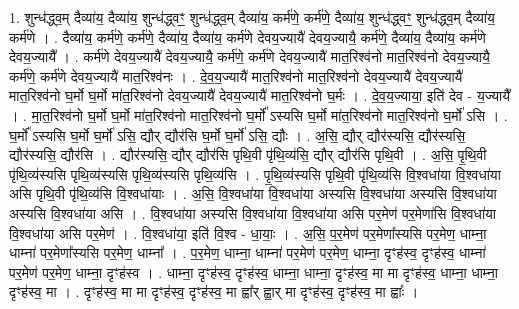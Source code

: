 \documentclass[17pt]{extarticle}
\begin{document}
1. शुन्ध॑द्ध्व॒म् दैव्या॑य॒ दैव्या॑य॒ शुन्ध॑द्ध्वꣳ॒॒ शुन्ध॑द्ध्व॒म् दैव्या॑य॒ कर्म॑णे॒ कर्म॑णे॒ दैव्या॑य॒ शुन्ध॑द्ध्वꣳ॒॒ शुन्ध॑द्ध्व॒म् दैव्या॑य॒ कर्म॑णे । . दैव्या॑य॒ कर्म॑णे॒ कर्म॑णे॒ दैव्या॑य॒ दैव्या॑य॒ कर्म॑णे देवय॒ज्यायै॑ देवय॒ज्यायै॒ कर्म॑णे॒ दैव्या॑य॒ दैव्या॑य॒ कर्म॑णे देवय॒ज्यायै᳚ । . कर्म॑णे देवय॒ज्यायै॑ देवय॒ज्यायै॒ कर्म॑णे॒ कर्म॑णे देवय॒ज्यायै॑ मात॒रिश्व॑नो मात॒रिश्व॑नो देवय॒ज्यायै॒ कर्म॑णे॒ कर्म॑णे देवय॒ज्यायै॑ मात॒रिश्व॑नः । . दे॒व॒य॒ज्यायै॑ मात॒रिश्व॑नो मात॒रिश्व॑नो देवय॒ज्यायै॑ देवय॒ज्यायै॑ मात॒रिश्व॑नो घ॒र्मो घ॒र्मो मा॑त॒रिश्व॑नो देवय॒ज्यायै॑ देवय॒ज्यायै॑ मात॒रिश्व॑नो घ॒र्मः । . दे॒व॒य॒ज्याया॒ इति॑ देव - य॒ज्यायै᳚ । . मा॒त॒रिश्व॑नो घ॒र्मो घ॒र्मो मा॑त॒रिश्व॑नो मात॒रिश्व॑नो घ॒र्मो᳚ ऽस्यसि घ॒र्मो मा॑त॒रिश्व॑नो मात॒रिश्व॑नो घ॒र्मो॑ ऽसि । . घ॒र्मो᳚ ऽस्यसि घ॒र्मो घ॒र्मो॑ ऽसि॒ द्यौर् द्यौर॑सि घ॒र्मो घ॒र्मो॑ ऽसि॒ द्यौः । . अ॒सि॒ द्यौर् द्यौर॑स्यसि॒ द्यौर॑स्यसि॒ द्यौर॑स्यसि॒ द्यौर॑सि । . द्यौर॑स्यसि॒ द्यौर् द्यौर॑सि पृथि॒वी पृ॑थि॒व्य॑सि॒ द्यौर् द्यौर॑सि पृथि॒वी । . अ॒सि॒ पृ॒थि॒वी पृ॑थि॒व्य॑स्यसि पृथि॒व्य॑स्यसि पृथि॒व्य॑स्यसि पृथि॒व्य॑सि । . पृ॒थि॒व्य॑स्यसि पृथि॒वी पृ॑थि॒व्य॑सि वि॒श्वधा॑या वि॒श्वधा॑या असि पृथि॒वी पृ॑थि॒व्य॑सि वि॒श्वधा॑याः । . अ॒सि॒ वि॒श्वधा॑या वि॒श्वधा॑या अस्यसि वि॒श्वधा॑या अस्यसि वि॒श्वधा॑या अस्यसि वि॒श्वधा॑या असि । . वि॒श्वधा॑या अस्यसि वि॒श्वधा॑या वि॒श्वधा॑या असि पर॒मेण॑ पर॒मेणा॑सि वि॒श्वधा॑या वि॒श्वधा॑या असि पर॒मेण॑ । . वि॒श्वधा॑या॒ इति॑ वि॒श्व - धा॒याः॒ । . अ॒सि॒ प॒र॒मेण॑ पर॒मेणा᳚स्यसि पर॒मेण॒ धाम्ना॒ धाम्ना॑ पर॒मेणा᳚स्यसि पर॒मेण॒ धाम्ना᳚ । . प॒र॒मेण॒ धाम्ना॒ धाम्ना॑ पर॒मेण॑ पर॒मेण॒ धाम्ना॒ दृꣳह॑स्व॒ दृꣳह॑स्व॒ धाम्ना॑ पर॒मेण॑ पर॒मेण॒ धाम्ना॒ दृꣳह॑स्व । . धाम्ना॒ दृꣳह॑स्व॒ दृꣳह॑स्व॒ धाम्ना॒ धाम्ना॒ दृꣳह॑स्व॒ मा मा दृꣳह॑स्व॒ धाम्ना॒ धाम्ना॒ दृꣳह॑स्व॒ मा । . दृꣳह॑स्व॒ मा मा दृꣳह॑स्व॒ दृꣳह॑स्व॒ मा ह्वा᳚र् ह्वा॒र् मा दृꣳह॑स्व॒ दृꣳह॑स्व॒ मा ह्वाः᳚ । \newline
\end{document}
